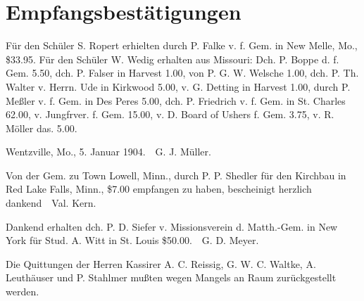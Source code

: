 \chapter{Empfangsbestätigungen}

Für den Schüler S. Ropert erhielten durch P. Falke v. f. Gem. in New Melle, Mo., \$33.95. Für den Schüler W. Wedig erhalten aus Missouri: Dch. P. Boppe d. f. Gem. 5.50, dch. P. Falser in Harvest 1.00, von P. G. W. Welsche 1.00, dch. P. Th. Walter v. Herrn. Ude in Kirkwood 5.00, v. G. Detting in Harvest 1.00, durch P. Meßler v. f. Gem. in Des Peres 5.00, dch. P. Friedrich v. f. Gem. in St. Charles 62.00, v. Jungfrver. f. Gem. 15.00, v. D. Board of Ushers f. Gem. 3.75, v. R. Möller das. 5.00.

Wentzville, Mo., 5. Januar 1904. G. J. Müller.

Von der Gem. zu Town Lowell, Minn., durch P. P. Shedler für den Kirchbau in Red Lake Falls, Minn., \$7.00 empfangen zu haben, bescheinigt herzlich dankend Val. Kern.

Dankend erhalten dch. P. D. Siefer v. Missionsverein d. Matth.-Gem. in New York für Stud. A. Witt in St. Louis \$50.00. G. D. Meyer.

Die Quittungen der Herren Kassirer A. C. Reissig, G. W. C. Waltke, A. Leuthäuser und P. Stahlmer mußten wegen Mangels an Raum zurückgestellt werden.
